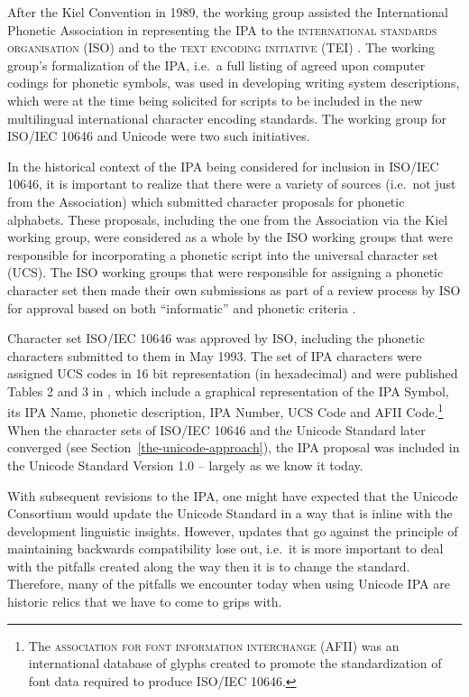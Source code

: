 After the Kiel Convention in 1989, the working group assisted
the International Phonetic Association in representing the IPA to the
\textsc{international standards organisation} (ISO) and to the \textsc{text
encoding initiative} (TEI) \citep{EslingGaylord1993}. The working group's
formalization of the IPA, i.e.\ a full listing of agreed upon computer codings
for phonetic symbols, was used in developing writing system descriptions, which
were at the time being solicited for scripts to be included in the new
multilingual international character encoding standards. The working group for
ISO/IEC 10646 and Unicode were two such initiatives.

In the historical context of the IPA being considered for inclusion in 
ISO/IEC 10646, it is important to realize that there were a variety of 
sources (i.e.\ not just from the Association) which submitted character 
proposals for phonetic alphabets. These proposals, including the one from the 
Association via the Kiel working group, were considered as a whole by 
the ISO working groups that were responsible for incorporating a phonetic 
script into the universal character set (UCS). The ISO working groups that 
were responsible for assigning a phonetic character set then made their 
own submissions as part of a review process by ISO for approval based on 
both ``informatic'' and phonetic criteria \citep[86]{EslingGaylord1993}. 

Character set ISO/IEC 10646 was approved by ISO, including the phonetic
characters submitted to them in May 1993. The set of IPA characters were
assigned UCS codes in 16 bit representation (in hexadecimal) and were published
Tables 2 and 3 in \cite{EslingGaylord1993}, which include a graphical
representation of the IPA Symbol, its IPA Name, phonetic description, IPA
Number, UCS Code and AFII Code.\footnote{The \textsc{association for font
information interchange} (AFII) was an international database of glyphs created
to promote the standardization of font data required to produce ISO/IEC 10646.} When the
character sets of ISO/IEC 10646 and the Unicode Standard later converged (see
Section~\ref{the-unicode-approach}), the IPA proposal was
included in the Unicode Standard Version 1.0 -- largely as we know it
today.

With subsequent revisions to the IPA, one might have expected that the Unicode
Consortium would update the Unicode Standard in a way that is inline with the
development linguistic insights. However, updates that go against the principle
of maintaining backwards compatibility lose out, i.e.\ it is more important to
deal with the pitfalls created along the way then it is to change the standard.
Therefore, many of the pitfalls we encounter today when using Unicode IPA are
historic relics that we have to come to grips with.

